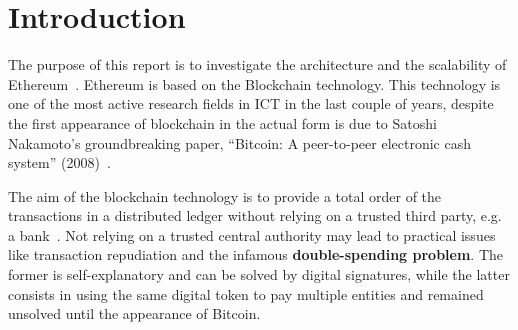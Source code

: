 \section*{Introduction}

The purpose of this report is to investigate the architecture and the 
scalability of Ethereum~\cite{wood2018ethereum}. Ethereum is based on the 
Blockchain technology. This technology is one of the most active research
fields in ICT in the last couple of years, despite the first appearance of
blockchain in the actual form is due to Satoshi Nakamoto's groundbreaking 
paper, ``Bitcoin: A peer-to-peer electronic cash system''
(2008)~\cite{bib:bitcoin}. 

The aim of the blockchain technology is to provide a total order of the 
transactions in a distributed ledger without relying on a trusted third party, 
e.g. a bank~\cite{bib:the-quest}. Not relying on a trusted central authority
may lead to practical issues like transaction repudiation and the infamous 
\textbf{double-spending problem}. The former is self-explanatory and can
be solved by digital signatures, while the latter consists in using the same
digital token to pay multiple entities and remained unsolved until the 
appearance of Bitcoin.

